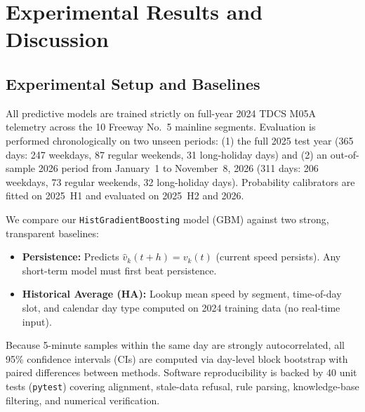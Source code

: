 \section{Experimental Results and Discussion}\label{sec:experiments}

\subsection{Experimental Setup and Baselines}
All predictive models are trained strictly on full-year 2024 TDCS M05A telemetry across the 10 Freeway No.~5 mainline segments. Evaluation is performed chronologically on two unseen periods: (1) the full 2025 test year (365 days: 247 weekdays, 87 regular weekends, 31 long-holiday days) and (2) an out-of-sample 2026 period from January~1 to November~8, 2026 (311 days: 206 weekdays, 73 regular weekends, 32 long-holiday days). Probability calibrators are fitted on 2025~H1 and evaluated on 2025~H2 and 2026.

We compare our \texttt{HistGradientBoosting} model (GBM) against two strong, transparent baselines:
\begin{itemize}
    \item \textbf{Persistence:} Predicts $\hat{v}_k(t+h) = v_k(t)$ (current speed persists). Any short-term model must first beat persistence.
    \item \textbf{Historical Average (HA):} Lookup mean speed by segment, time-of-day slot, and calendar day type computed on 2024 training data (no real-time input).
\end{itemize}
Because 5-minute samples within the same day are strongly autocorrelated, all 95\% confidence intervals (CIs) are computed via day-level block bootstrap with paired differences between methods. Software reproducibility is backed by 40 unit tests (\texttt{pytest}) covering alignment, stale-data refusal, rule parsing, knowledge-base filtering, and numerical verification.

